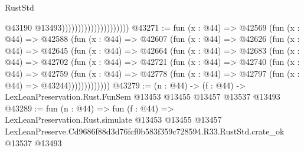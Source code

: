 \begin{lexlean}{RustStd}
\begin{coremodule}
                                              @43190
                                              @13493)))))))))))))))))))))
@43271 := fun (x : @44) =>
  @42569
    (fun (x : @44) =>
    @42588
      (fun (x : @44) =>
      @42607
        (fun (x : @44) =>
        @42626
          (fun (x : @44) =>
          @42645
            (fun (x : @44) =>
            @42664
              (fun (x : @44) =>
              @42683
                (fun (x : @44) =>
                @42702
                  (fun (x : @44) =>
                  @42721
                    (fun (x : @44) =>
                    @42740
                      (fun (x : @44) =>
                      @42759
                        (fun (x : @44) =>
                        @42778 (fun (x : @44) => @42797 (fun (x : @44) => @43244)))))))))))))
@43279 := (n : @44) ->
  (f : @44) -> LexLeanPreservation.Rust.FunSem @13453 @13455 @13457 @13537 @13493
@43289 := fun (n : @44) =>
  fun (f : @44) =>
  LexLeanPreservation.Rust.simulate
    @13453
    @13455
    @13457
    LexLeanPreserve.Cd9686f88d3d76fcf0b583f359c728594.R33.RustStd.crate_ok
    @13537
    @13493
\end{coremodule}
\end{lexlean}
